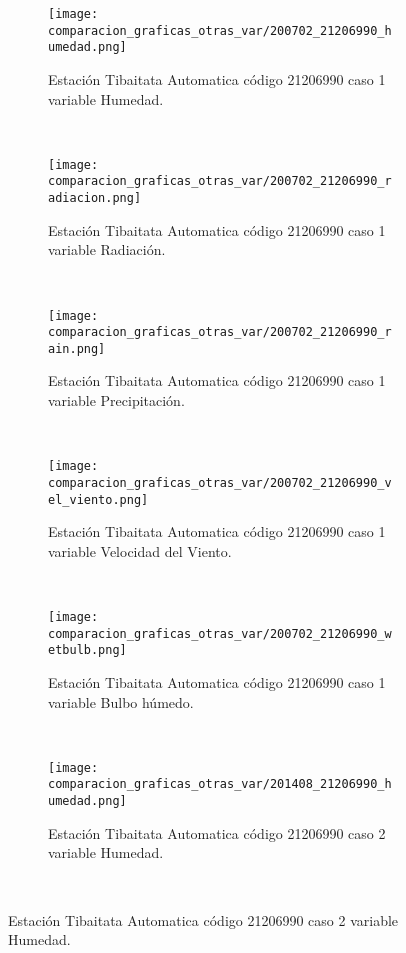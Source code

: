 \begin{figure}[H]
\centering
\begin{subfigure}[normla]{0.4\textwidth}
\caption{Estación Tibaitata Automatica código 21206990 caso 1 variable Humedad.}
\texttt{[image: comparacion\_graficas\_otras\_var/200702\_21206990\_humedad.png]}
\end{subfigure}
~
\begin{subfigure}[normla]{0.4\textwidth}
\caption{Estación Tibaitata Automatica código 21206990 caso 1 variable Radiación.}
\texttt{[image: comparacion\_graficas\_otras\_var/200702\_21206990\_radiacion.png]}
\end{subfigure}
~
\begin{subfigure}[normla]{0.4\textwidth}
\caption{Estación Tibaitata Automatica código 21206990 caso 1 variable Precipitación.}
\texttt{[image: comparacion\_graficas\_otras\_var/200702\_21206990\_rain.png]}
\end{subfigure}
~
\begin{subfigure}[normla]{0.4\textwidth}
\caption{Estación Tibaitata Automatica código 21206990 caso 1 variable Velocidad del Viento.}
\texttt{[image: comparacion\_graficas\_otras\_var/200702\_21206990\_vel\_viento.png]}
\end{subfigure}
~
\begin{subfigure}[normla]{0.4\textwidth}
\caption{Estación Tibaitata Automatica código 21206990 caso 1 variable Bulbo húmedo.}
\texttt{[image: comparacion\_graficas\_otras\_var/200702\_21206990\_wetbulb.png]}
\end{subfigure}
~
\begin{subfigure}[normla]{0.4\textwidth}
\caption{Estación Tibaitata Automatica código 21206990 caso 2 variable Humedad.}
\texttt{[image: comparacion\_graficas\_otras\_var/201408\_21206990\_humedad.png]}
\end{subfigure}
~
\end{figure}
           
